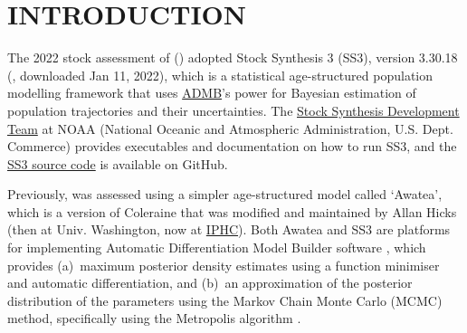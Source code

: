 \documentclass[11pt]{book}
\begin{document}
\newcommand{\LH}{}%
\newcommand{\RH}{}%
\newcommand{\LF}{\spn{} 2022}
\newcommand{\RF}{APPENDIX~\thechapter ~-- Model Equations}

\lhead{\LH}\rhead{\RH}\lfoot{\LF}\rfoot{\RF}

\newcommand{\nSims}{8,000\,(for base)\,/ 4,000\,(for sensitivities)}
\newcommand{\nChains}{8}
\newcommand{\cSims}{1,000\,(base)\,/ 500\,(sens)}
\newcommand{\cBurn}{750\,(base)\,/ 250\,(sens)}
\newcommand{\cSamps}{250}
\newcommand{\Nmcmc}{2,000}
\newcommand{\Nbase}{2,000}

\newcommand{\harvestMax}{0.401}
\newcommand{\harvestInc}{0.001}
\newcommand{\policyMax}{2000}
\newcommand{\policyInc}{250}
\newcommand{\currYear}{2023} %
\newcommand{\prevYear}{2022} %
\newcommand{\projYear}{2033} %

\section{INTRODUCTION}%

The 2022 stock assessment of \spn{} (\spc) adopted Stock Synthesis 3 (SS3), version 3.30.18 (\citealt{Methot-etal:2021}, downloaded Jan 11, 2022), which is a statistical age-structured population modelling framework \citep{Methot-Wetzel:2013} that uses \href{https://www.admb-project.org/}{ADMB}'s power for Bayesian estimation of population trajectories and their uncertainties.
The \href{https://vlab.ncep.noaa.gov/web/stock-synthesis/home}{Stock Synthesis Development Team} at NOAA (National Oceanic and Atmospheric Administration, U.S. Dept. Commerce) provides executables and documentation on how to run SS3, and the \href{https://github.com/nmfs-stock-synthesis/stock-synthesis}{SS3 source code} is available on GitHub.

Previously, \spc{} was assessed using a simpler age-structured model called `Awatea', which is a version of Coleraine \citep{Hilborn-etal:2003} that was modified and maintained by Allan Hicks (then at Univ. Washington, now at \href{https://www.iphc.int/}{IPHC}).
Both Awatea and SS3 are platforms for implementing Automatic Differentiation Model Builder software \citep{ADMB:2009}, which provides (a)~maximum posterior density estimates using a function minimiser and automatic differentiation, and (b)~an approximation of the posterior distribution of the parameters using the Markov Chain Monte Carlo (MCMC) method, specifically using the Metropolis algorithm \citep{Gelman-etal:2004}.
\end{document}
